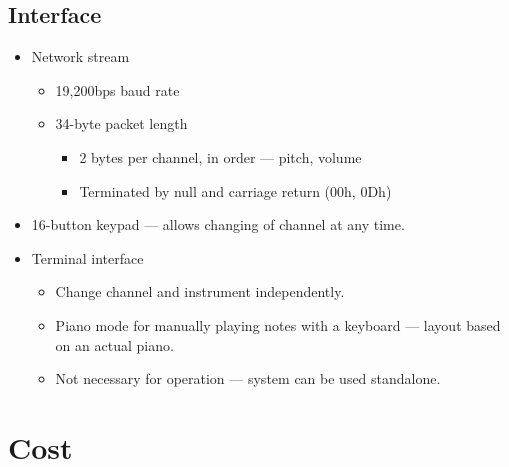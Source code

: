 \subsection{Interface}
\begin{itemize}
\item Network stream
    \begin{itemize}
    \item 19,200bps baud rate
    \item 34-byte packet length
        \begin{itemize}
        \item 2 bytes per channel, in order --- pitch, volume
        \item Terminated by null and carriage return (00h, 0Dh)
        \end{itemize}
    \end{itemize}
\item 16-button keypad --- allows changing of channel at any time.
\item Terminal interface
    \begin{itemize}
    \item Change channel and instrument independently.
    \item Piano mode for manually playing notes with a keyboard --- layout based on an actual piano.
    \item Not necessary for operation --- system can be used standalone.
    \end{itemize}
\end{itemize}


\section{Cost}
\label{sec:spec:cost}

